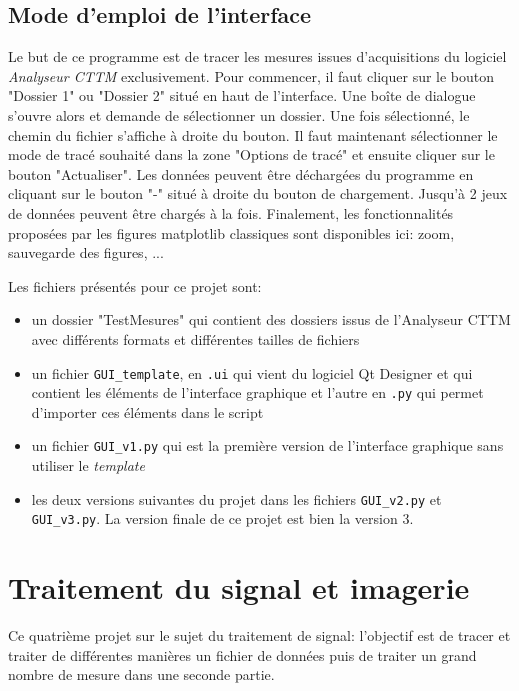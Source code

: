 \documentclass[a4paper, 11pt]{article}
\begin{document}
\subsection{Mode d'emploi de l'interface}
Le but de ce programme est de tracer les mesures issues d'acquisitions du logiciel \textit{Analyseur CTTM} exclusivement. Pour commencer, il faut cliquer sur le bouton "Dossier 1" ou "Dossier 2" situé en haut de l'interface. Une boîte de dialogue s'ouvre alors et demande de sélectionner un dossier. Une fois sélectionné, le chemin du fichier s'affiche à droite du bouton. Il faut maintenant sélectionner le mode de tracé souhaité dans la zone "Options de tracé" et ensuite cliquer sur le bouton "Actualiser". Les données peuvent être déchargées du programme en cliquant sur le bouton "-" situé à droite du bouton de chargement. Jusqu'à 2 jeux de données peuvent être chargés à la fois. Finalement, les fonctionnalités proposées par les figures matplotlib classiques sont disponibles ici: zoom, sauvegarde des figures, ...

Les fichiers présentés pour ce projet sont:
\begin{itemize}
	\item un dossier "TestMesures" qui contient des dossiers issus de l'Analyseur CTTM avec différents formats et différentes tailles de fichiers
	\item un fichier \verb|GUI_template|, en \verb|.ui| qui vient du logiciel Qt Designer et qui contient les éléments de l'interface graphique et l'autre en \verb|.py| qui permet d'importer ces éléments dans le script
	\item un fichier \verb|GUI_v1.py| qui est la première version de l'interface graphique sans utiliser le \textit{template}
	\item les deux versions suivantes du projet dans les fichiers \verb|GUI_v2.py| et \verb|GUI_v3.py|. La version finale de ce projet est bien la version 3.	
\end{itemize}



\newpage
\section{Traitement du signal et imagerie}
Ce quatrième projet sur le sujet du traitement de signal: l'objectif est de tracer et traiter de différentes manières un fichier de données puis de traiter un grand nombre de mesure dans une seconde partie. 
\end{document}
